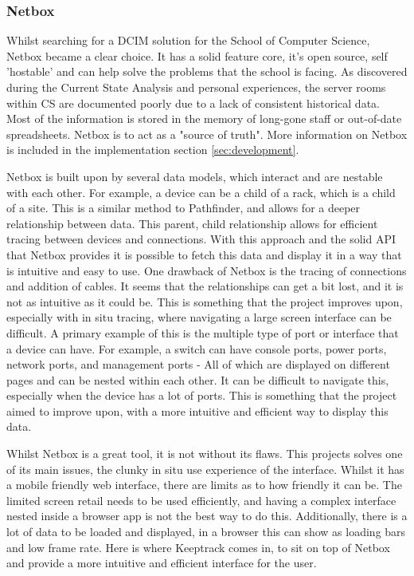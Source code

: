 \documentclass [11pt,a4paper]{article}
\begin{document}
\subsubsection{Netbox}
\label{sec:netbox}
Whilst searching for a DCIM solution for the School of Computer Science, Netbox became a clear choice. It has a solid feature core, it's open source, self 'hostable' and can help solve the problems that the school is facing. As discovered during the Current State Analysis and personal experiences, the server rooms within CS are documented poorly due to a lack of consistent historical data. Most of the information is stored in the memory of long-gone staff or out-of-date spreadsheets. Netbox is to act as a "source of truth"\cite{Netbox}. More information on Netbox is included in the implementation section \ref{sec:development}. 

Netbox is built upon by several data models, which interact and are nestable with each other. For example, a device can be a child of a rack, which is a child of a site. This is a similar method to Pathfinder, and allows for a deeper relationship between data. This parent, child relationship allows for efficient tracing between devices and connections. With this approach and the solid API that Netbox provides it is possible to fetch this data and display it in a way that is intuitive and easy to use. One drawback of Netbox is the tracing of connections and addition of cables. It seems that the relationships can get a bit lost, and it is not as intuitive as it could be. This is something that the project improves upon, especially with in situ tracing, where navigating a large screen interface can be difficult. A primary example of this is the multiple type of port or interface that a device can have. For example, a switch can have console ports, power ports,  network ports, and management ports - All of which are displayed on different pages and can be nested within each other. It can be difficult to navigate this, especially when the device has a lot of ports. This is something that the project aimed to improve upon, with a more intuitive and efficient way to display this data.

Whilst Netbox is a great tool, it is not without its flaws. This projects solves one of its main issues, the clunky in situ use experience of the interface. Whilst it has a mobile friendly web interface, there are limits as to how friendly it can be. The limited screen retail needs to be used efficiently, and having a complex interface nested inside a browser app is not the best way to do this. Additionally, there is a lot of data to be loaded and displayed, in a browser this can show as loading bars and low frame rate. Here is where Keeptrack comes in, to sit on top of Netbox and provide a more intuitive and efficient interface for the user.  
\end{document}
